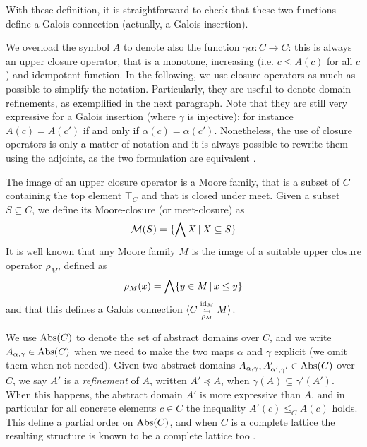 \begin{example}[Intervals]
	With these definition, it is straightforward to check that these two functions define a Galois connection (actually, a Galois insertion).
\end{example}

We overload the symbol $A$ to denote also the function $\gamma \alpha: C \rightarrow C$: this is always an upper closure operator, that is a monotone, increasing (i.e. $c \le A(c)$ for all $c$) and idempotent function. In the following, we use closure operators as much as possible to simplify the notation. Particularly, they are useful to denote domain refinements, as exemplified in the next paragraph.
Note that they are still very expressive for a Galois insertion (where $\gamma$ is injective): for instance $A(c) = A(c')$ if and only if $\alpha(c) = \alpha(c')$. Nonetheless, the use of closure operators is only a matter of notation and it is always possible to rewrite them using the adjoints, as the two formulation are equivalent \cite{CC79}.

The image of an upper closure operator is a Moore family, that is a subset of $C$ containing the top element $\top_C$ and that is closed under meet. Given a subset $S \subseteq C$, we define its Moore-closure (or meet-closure) as
\[
\mathcal{M}(S) = \{ \bigwedge X \,\vert\, X \subseteq S \}
\]
It is well known that any Moore family $M$ is the image of a suitable upper closure operator $\rho_M$, defined as
\[
\rho_M(x) = \bigwedge \{ y \in M \,\vert\, x \le y \}
\]
and that this defines a Galois connection $\langle C \mathrel{\substack{\text{id}_M \\ \leftrightarrows \\ \rho_M}} M\rangle$.

We use $\text{\normalfont Abs}(C)$ to denote the set of abstract domains over $C$, and we write $A_{\alpha, \gamma} \in \text{\normalfont Abs}(C)$ when we need to make the two maps $\alpha$ and $\gamma$ explicit (we omit them when not needed).
Given two abstract domains $A_{\alpha, \gamma}, A'_{\alpha', \gamma'} \in \text{\normalfont Abs}(C)$ over $C$, we say $A'$ is a \emph{refinement} of $A$, written $A' \preceq A$, when $\gamma(A) \subseteq \gamma'(A')$. When this happens, the abstract domain $A'$ is more expressive than $A$, and in particular for all concrete elements $c \in C$ the inequality $A'(c) \le_C A(c)$ holds. This define a partial order on $\text{\normalfont Abs}(C)$, and when $C$ is a complete lattice the resulting structure is known to be a complete lattice too \cite{CC79}.

